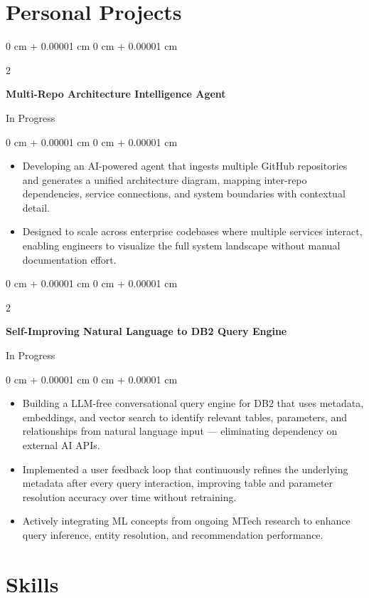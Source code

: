 \documentclass[10pt, letterpaper]{article}
\newenvironment{highlights}{
    \begin{itemize}[
        topsep=0.10 cm,
        parsep=0.10 cm,
        partopsep=0pt,
        itemsep=0pt,
        leftmargin=0 cm + 10pt
    ]
}{
    \end{itemize}
} %
\newenvironment{onecolentry}{
    \begin{adjustwidth}{
        0 cm + 0.00001 cm
    }{
        0 cm + 0.00001 cm
    }
}{
    \end{adjustwidth}
} %
\newenvironment{twocolentry}[2][]{
    \onecolentry
    \def\secondColumn{#2}
    \setcolumnwidth{\fill, 4.5 cm}
    \begin{paracol}{2}
}{
    \switchcolumn \raggedleft \secondColumn
    \end{paracol}
    \endonecolentry
} %
\begin{document}
\section{Personal Projects}

\begin{twocolentry}{In Progress}
    \textbf{Multi-Repo Architecture Intelligence Agent}
\end{twocolentry}
\vspace{0.1 cm}
\begin{onecolentry}
    \begin{highlights}
        \item Developing an AI-powered agent that ingests multiple GitHub repositories and generates a unified architecture diagram, mapping inter-repo dependencies, service connections, and system boundaries with contextual detail.
        \item Designed to scale across enterprise codebases where multiple services interact, enabling engineers to visualize the full system landscape without manual documentation effort.
    \end{highlights}
\end{onecolentry}
\vspace{0.2 cm}
\begin{twocolentry}{In Progress}
    \textbf{Self-Improving Natural Language to DB2 Query Engine}
\end{twocolentry}
\vspace{0.1 cm}
\begin{onecolentry}
    \begin{highlights}
        \item Building a LLM-free conversational query engine for DB2 that uses metadata, embeddings, and vector search to identify relevant tables, parameters, and relationships from natural language input — eliminating dependency on external AI APIs.
        \item Implemented a user feedback loop that continuously refines the underlying metadata after every query interaction, improving table and parameter resolution accuracy over time without retraining.
        \item Actively integrating ML concepts from ongoing MTech research to enhance query inference, entity resolution, and recommendation performance.
    \end{highlights}
\end{onecolentry}


    
 \section{Skills}
        
\end{document}
